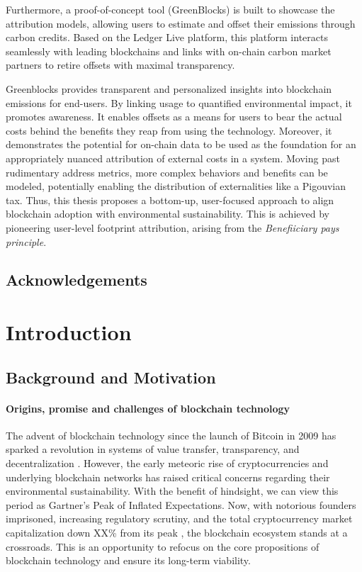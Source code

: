 \documentclass[11pt]{report}
\begin{document}
Furthermore, a proof-of-concept tool (GreenBlocks) is built to showcase the attribution models, allowing users to estimate and offset their emissions through carbon credits. Based on the Ledger Live platform, this platform interacts seamlessly with leading blockchains and links with on-chain carbon market partners to retire offsets with maximal transparency.

Greenblocks provides transparent and personalized insights into blockchain emissions for end-users. By linking usage to quantified environmental impact, it promotes awareness. It enables offsets as a means for users to bear the actual costs behind the benefits they reap from using the technology. Moreover, it demonstrates the potential for on-chain data to be used as the foundation for an appropriately nuanced attribution of external costs in a system. Moving past rudimentary address metrics, more complex behaviors and benefits can be modeled, potentially  enabling the distribution of externalities like a Pigouvian tax. Thus, this thesis proposes a bottom-up, user-focused approach to align blockchain adoption with environmental sustainability. This is achieved by pioneering user-level footprint attribution, arising from the \textit{Benefiiciary pays principle}.



\newpage
\section*{Acknowledgements}
\tableofcontents

\printacronyms

\chapter{Introduction}

\section{Background and Motivation}
\subsubsection*{Origins, promise and challenges of blockchain technology}
The advent of blockchain technology since the launch of Bitcoin in 2009 has sparked a revolution in systems of value transfer, transparency, and decentralization \cite{nakamotoBitcoinPeertopeerElectronic2008}. However, the early meteoric rise of cryptocurrencies and underlying blockchain networks has raised critical concerns regarding their environmental sustainability. With the benefit of hindsight, we can view this period as Gartner's Peak of Inflated Expectations. Now, with notorious founders imprisoned, increasing regulatory scrutiny, and the total cryptocurrency market capitalization down
XX\% from its peak , the blockchain ecosystem stands at a crossroads. This is an opportunity to refocus on the core propositions of blockchain technology and ensure its long-term viability.
\end{document}
